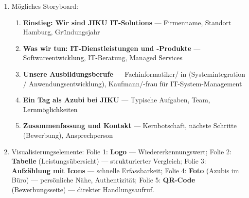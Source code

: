 \documentclass[11pt, a4paper]{article}
\begin{document}
\begin{enumerate}[label=(\alph*)]
  \item Mögliches Storyboard:
  \begin{enumerate}
    \item \textbf{Einstieg: Wir sind JIKU IT-Solutions} --- Firmenname, Standort Hamburg, Gründungsjahr
    \item \textbf{Was wir tun: IT-Dienstleistungen und -Produkte} --- Softwareentwicklung, IT-Beratung, Managed Services
    \item \textbf{Unsere Ausbildungsberufe} --- Fachinformatiker/-in (Systemintegration / Anwendungsentwicklung), Kaufmann/-frau für IT-System-Management
    \item \textbf{Ein Tag als Azubi bei JIKU} --- Typische Aufgaben, Team, Lernmöglichkeiten
    \item \textbf{Zusammenfassung und Kontakt} --- Kernbotschaft, nächste Schritte (Bewerbung), Ansprechperson
  \end{enumerate}

  \item Visualisierungselemente:
  Folie 1: \textbf{Logo} --- Wiedererkennungswert; Folie 2: \textbf{Tabelle} (Leistungsübersicht) --- strukturierter Vergleich; Folie 3: \textbf{Aufzählung mit Icons} --- schnelle Erfassbarkeit; Folie 4: \textbf{Foto} (Azubis im Büro) --- persönliche Nähe, Authentizität; Folie 5: \textbf{QR-Code} (Bewerbungsseite) --- direkter Handlungsaufruf.
\end{enumerate}
\end{document}
